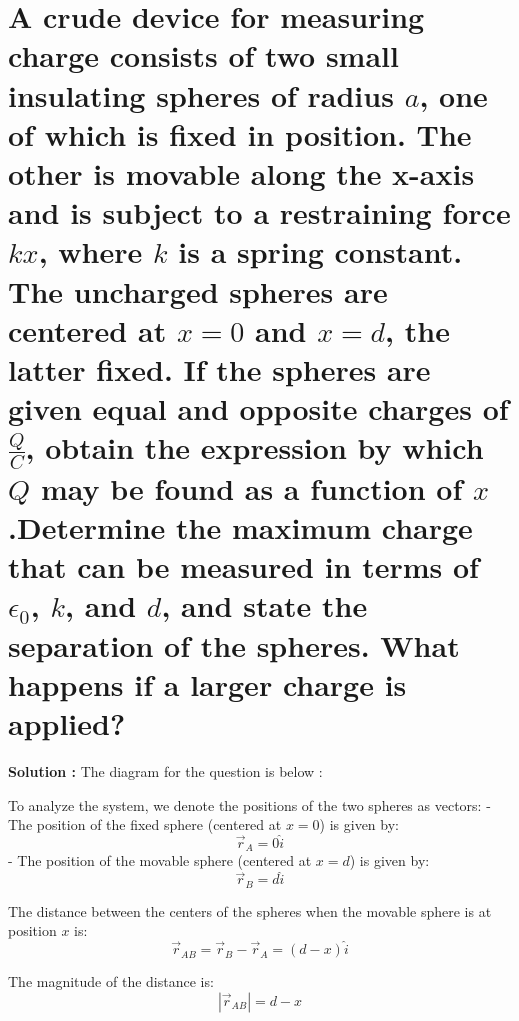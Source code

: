 \documentclass[a4paper,12pt]{article}
\begin{document}
\section{A crude device for measuring charge consists of two small insulating spheres of radius $ a $, one of which is fixed in position. The other is movable along the x-axis and is subject to a restraining force $ kx $, where $ k $ is a spring constant. The uncharged spheres are centered at $ x = 0$ and $ x = d $, the latter fixed. If the spheres are given equal and opposite charges of $ \frac{Q}{C} $, obtain the expression by which $ Q $ may be found as a function of $ x$.Determine the maximum charge that can be measured in terms of $ \epsilon_0 $, $ k $, and $ d $, and state the separation of the spheres. What happens if a larger charge is applied?}
\textbf{Solution :} The diagram for the question is below :
\begin{figure}[!ht]
\centering
{}%

\label{fig:my_label}
\end{figure}
To analyze the system, we denote the positions of the two spheres as vectors:
- The position of the fixed sphere (centered at \( x = 0 \)) is given by:
  \[
  \vec{r}_A = 0 \hat{i}
  \]
- The position of the movable sphere (centered at \( x = d \)) is given by:
  \[
  \vec{r}_B = d \hat{i}
  \]

The distance between the centers of the spheres when the movable sphere is at position \( x \) is:
\[
\vec{r}_{AB} = \vec{r}_B - \vec{r}_A = (d - x) \hat{i}
\]

The magnitude of the distance is:
\[
|\vec{r}_{AB}| = d - x
\]
\end{document}
